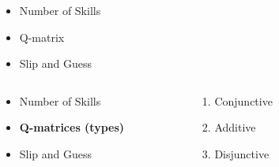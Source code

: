 \documentclass{beamer}
\begin{document}
\begin{frame}
\begin{overprint}
\begin{columns}
\begin{column}{0.7\textwidth}
	      \end{column}
	     \end{columns}
		\begin{columns}
		\begin{column}{0.35\textwidth}
      		\begin{itemize}
      			\item Number of Skills
      			\item Q-matrix 
      			\item Slip and Guess
	      	\end{itemize}
	      \end{column}
	      \begin{column}{0.7\textwidth}
	      \end{column}
	     \end{columns}
	     \onslide<4>
	     		\begin{columns}
		\begin{column}{0.4\textwidth}
      		\begin{itemize}
      		      		   	\vspace{-0.5cm}
      			\item Number of Skills
      			\item \textbf{Q-matrices (types)}
      			\item Slip and Guess
	      	\end{itemize}
	      \end{column}
	      \begin{column}{0.25\textwidth}
	      \begin{enumerate}
	      \item Conjunctive
	      \item Additive 
	      \item Disjunctive
	      \end{enumerate}
	      \end{column}
	      \begin{column}{0.4\textwidth}
	      
	      \resizebox{0.66\columnwidth}{1.2cm}{

}
\end{column}
\end{columns}
\end{overprint}
\end{frame}
\end{document}
